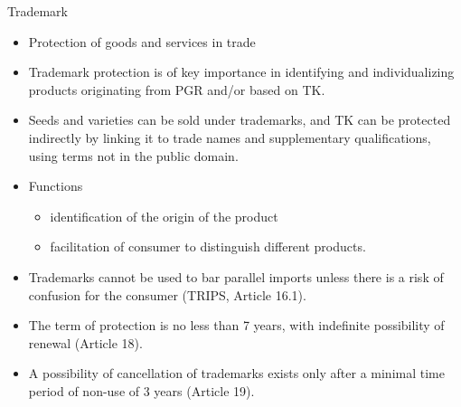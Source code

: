 \documentclass[
  ignorenonframetext,
  aspectratio=169]{beamer}
\providecommand{\tightlist}{%
  \setlength{\itemsep}{0pt}\setlength{\parskip}{0pt}}
\begin{document}
\begin{frame}{Trademark}
\protect\hypertarget{trademark}{}
\begin{itemize}
\tightlist
\item
  Protection of goods and services in trade
\item
  Trademark protection is of key importance in identifying and
  individualizing products originating from PGR and/or based on TK.
\item
  Seeds and varieties can be sold under trademarks, and TK can be
  protected indirectly by linking it to trade names and supplementary
  qualifications, using terms not in the public domain.
\item
  Functions

  \begin{itemize}
  \tightlist
  \item
    identification of the origin of the product
  \item
    facilitation of consumer to distinguish different products.
  \end{itemize}
\item
  Trademarks cannot be used to bar parallel imports unless there is a
  risk of confusion for the consumer (TRIPS, Article 16.1).
\item
  The term of protection is no less than 7 years, with indefinite
  possibility of renewal (Article 18).
\item
  A possibility of cancellation of trademarks exists only after a
  minimal time period of non-use of 3 years (Article 19).
\end{itemize}
\end{frame}
\end{document}
